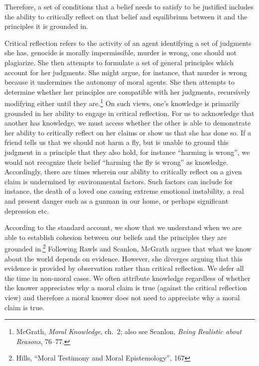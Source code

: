 \documentclass[phdthesis,12pt,final]{wuthesis}
\theoremstyle{definition}
\theoremstyle{definition}
\theoremstyle{definition}
\theoremstyle{definition}
\theoremstyle{remark}
\begin{document}
\label{refl-equi}
Therefore, a set of conditions that a belief needs to satisfy to be justified includes the ability to critically reflect on that belief and equilibrium between it and the principles it is grounded in.

Critical reflection refers to the activity of an agent identifying a set of judgments she has, genocide is morally impermissible, murder is wrong, one should not plagiarize. She then attempts to formulate a set of general principles which account for her judgments. She might argue, for instance, that murder is wrong because it undermines the autonomy of moral agents. She then attempts to determine whether her principles are compatible with her judgments, recursively modifying either until they are.\footnote{McGrath, \emph{Moral {Knowledge}}, ch.~2; also see Scanlon, \emph{Being Realistic about Reasons}, 76--77.} On such views, one's knowledge is primarily grounded in her ability to engage in critical reflection. For us to acknowledge that another has knowledge, we must access whether the other is able to demonstrate her ability to critically reflect on her claims or show us that she has done so. If a friend tells us that we should not harm a fly, but is unable to ground this judgment in a principle that they also hold, for instance ``harming is wrong'', we would not recognize their belief ``harming the fly is wrong'' as knowledge. Accordingly, there are times wherein our ability to critically reflect on a given claim is undermined by environmental factors. Such factors can include for instance, the death of a loved one causing extreme emotional instability, a real and present danger such as a gunman in our home, or perhaps significant depression etc.

According to the standard account, we show that we understand when we are able to establish cohesion between our beliefs and the principles they are grounded in.\footnote{Hills, {``Moral Testimony and Moral Epistemology''}, 167} Following Rawls and Scanlon, McGrath argues that what we know about the world depends on evidence. However, she diverges arguing that this evidence is provided by observation rather than critical reflection. We defer all the time in non-moral cases. We often attribute knowledge regardless of whether the knower appreciates why a moral claim is true (against the critical reflection view) and therefore a moral knower does not need to appreciate why a moral claim is true.
\end{document}
